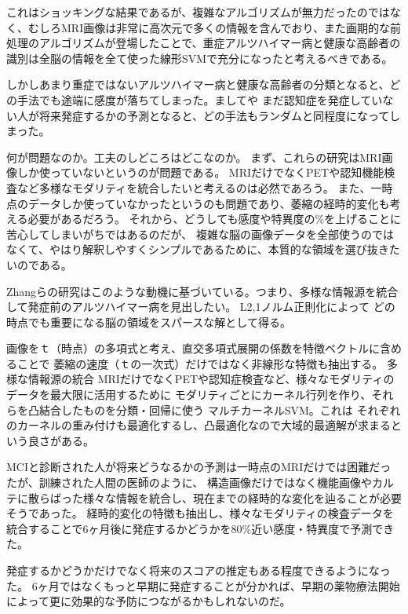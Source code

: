 これはショッキングな結果であるが、複雑なアルゴリズムが無力だったのではなく、むしろMRI画像は非常に高次元で多くの情報を含んでおり、また画期的な前処理のアルゴリズムが登場したことで、重症アルツハイマー病と健康な高齢者の識別は全脳の情報を全て使った線形SVMで充分になったと考えるべきである。

しかしあまり重症ではないアルツハイマー病と健康な高齢者の分類となると、どの手法でも途端に感度が落ちてしまった。ましてや
まだ認知症を発症していない人が将来発症するかの予測となると、どの手法もランダムと同程度になってしまった。

何が問題なのか。工夫のしどころはどこなのか。
まず、これらの研究はMRI画像しか使っていないというのが問題である。
MRIだけでなくPETや認知機能検査など多様なモダリティを統合したいと考えるのは必然であろう。
また、一時点のデータしか使っていなかったというのも問題であり、萎縮の経時的変化も考える必要があるだろう。
それから、どうしても感度や特異度の\%を上げることに苦心してしまいがちではあるのだが、
複雑な脳の画像データを全部使うのではなくて、やはり解釈しやすくシンプルであるために、本質的な領域を選び抜きたいのである。

Zhangらの研究はこのような動機に基づいている。つまり、多様な情報源を統合して発症前のアルツハイマー病を見出したい。
L2,1ノルム正則化によって
どの時点でも重要になる脳の領域をスパースな解として得る。

画像をｔ（時点）の多項式と考え、直交多項式展開の係数を特徴ベクトルに含めることで
萎縮の速度（ｔの一次式）だけではなく非線形な特徴も抽出する。
多様な情報源の統合
MRIだけでなくPETや認知症検査など、様々なモダリティのデータを最大限に活用するために
モダリティごとにカーネル行列を作り、それらを凸結合したものを分類・回帰に使う
マルチカーネルSVM。これは
それぞれのカーネルの重み付けも最適化するし、凸最適化なので大域的最適解が求まるという良さがある。

MCIと診断された人が将来どうなるかの予測は一時点のMRIだけでは困難だったが、訓練された人間の医師のように、
構造画像だけではなく機能画像やカルテに散らばった様々な情報を統合し、現在までの経時的な変化を辿ることが必要そうであった。
経時的変化の特徴も抽出し、様々なモダリティの検査データを統合することで6ヶ月後に発症するかどうかを80\%近い感度・特異度で予測できた。

発症するかどうかだけでなく将来のスコアの推定もある程度できるようになった。
6ヶ月ではなくもっと早期に発症することが分かれば、早期の薬物療法開始によって更に効果的な予防につながるかもしれないのだ。

%

